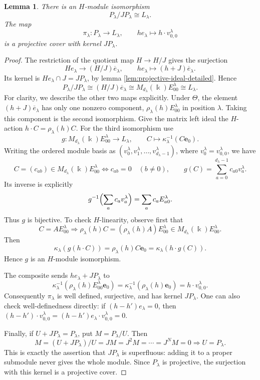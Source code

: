 \documentclass[10pt,oneside]{amsart}
\newcommand{\kk}{\Bbbk}
\newtheorem{lemma}[proposition]{Lemma}
\theoremstyle{definition}
\begin{document}
\begin{lemma}\label{lem:top-projective-detailed}
There is an $H$-module isomorphism
\[
 P_\lambda/JP_\lambda\cong L_\lambda.
\]
The map
\[
 \pi_\lambda:P_\lambda\longrightarrow L_\lambda,\qquad
 he_\lambda\longmapsto h\cdot v_{0,0}^\lambda
\]
is a projective cover with kernel $JP_\lambda$.
\end{lemma}
\begin{proof}
The restriction of the quotient map $H\to H/J$ gives the surjection
\[
 He_\lambda\longrightarrow(H/J)\overline e_\lambda,\qquad
 he_\lambda\longmapsto(h+J)\overline e_\lambda.
\]
Its kernel is $He_\lambda\cap J=JP_\lambda$, by  lemma \ref{lem:projective-ideal-detailed}.
Hence
\[
 P_\lambda/JP_\lambda
 \cong(H/J)\overline e_\lambda
 \cong M_{d_\lambda}(\kk)E_{00}^\lambda
 \cong L_\lambda.
\]
For clarity, we describe the other two maps explicitly.
Under $\Theta$, the element $(h+J)\overline e_\lambda$ has only one
nonzero component, $\rho_\lambda(h)E_{00}^\lambda$ in position $\lambda$.
Taking this component is the second isomorphism. Give the matrix
left ideal the $H$-action $h\cdot C=\rho_\lambda(h)C$.
For the third isomorphism use
\[
 g:M_{d_\lambda}(\kk)E_{00}^\lambda\longrightarrow L_\lambda,
 \qquad C\longmapsto\kappa_\lambda^{-1}(C\mathbf e_0).
\]
Writing the ordered module basis as
$(v_0^\lambda,v_1^\lambda,\ldots,v_{d_\lambda-1}^\lambda)$,
where $v_0^\lambda=v_{0,0}^\lambda$, we have
\[
 C=(c_{ab})\in M_{d_\lambda}(\kk)E_{00}^\lambda
 \Longleftrightarrow c_{ab}=0\quad(b\ne0),
 \qquad
 g(C)=\sum_{a=0}^{d_\lambda-1}c_{a0}v_a^\lambda.
\]
Its inverse is explicitly
\[
 g^{-1}\Bigl(\sum_ac_av_a^\lambda\Bigr)
   =\sum_ac_aE_{a0}^\lambda.
\]
Thus $g$ is bijective. To check $H$-linearity, observe first that
\[
 C=AE_{00}^\lambda
 \Longrightarrow\rho_\lambda(h)C
   =(\rho_\lambda(h)A)E_{00}^\lambda
   \in M_{d_\lambda}(\kk)E_{00}^\lambda.
\]
Then
\[
 \kappa_\lambda(g(h\cdot C))
 =\rho_\lambda(h)C\mathbf e_0
 =\kappa_\lambda(h\cdot g(C)).
\] Hence $g$ is an $H$-module isomorphism.

The composite sends $he_\lambda+JP_\lambda$ to
\[
 \kappa_\lambda^{-1}(\rho_\lambda(h)E_{00}^\lambda\mathbf e_0)
 =\kappa_\lambda^{-1}(\rho_\lambda(h)\mathbf e_0)
 =h\cdot v_{0,0}^\lambda.
\]
Consequently $\pi_\lambda$ is well defined, surjective, and has kernel
$JP_\lambda$. One can also check well-definedness directly: if
$(h-h')e_\lambda=0$, then
$(h-h')\cdot v_{0,0}^\lambda=(h-h')e_\lambda\cdot v_{0,0}^\lambda=0$.

Finally, if $U+JP_\lambda=P_\lambda$, put $M=P_\lambda/U$.
Then
\[
 M={(U+JP_\lambda)}/U=JM=J^2M=\cdots=J^NM=0
 \Longrightarrow U=P_\lambda.
\]
This is exactly the assertion that $JP_\lambda$ is superfluous:
adding it to a proper submodule never gives the whole module.
Since $P_\lambda$ is projective, the surjection with this kernel
is a projective cover.
\end{proof}
\end{document}

